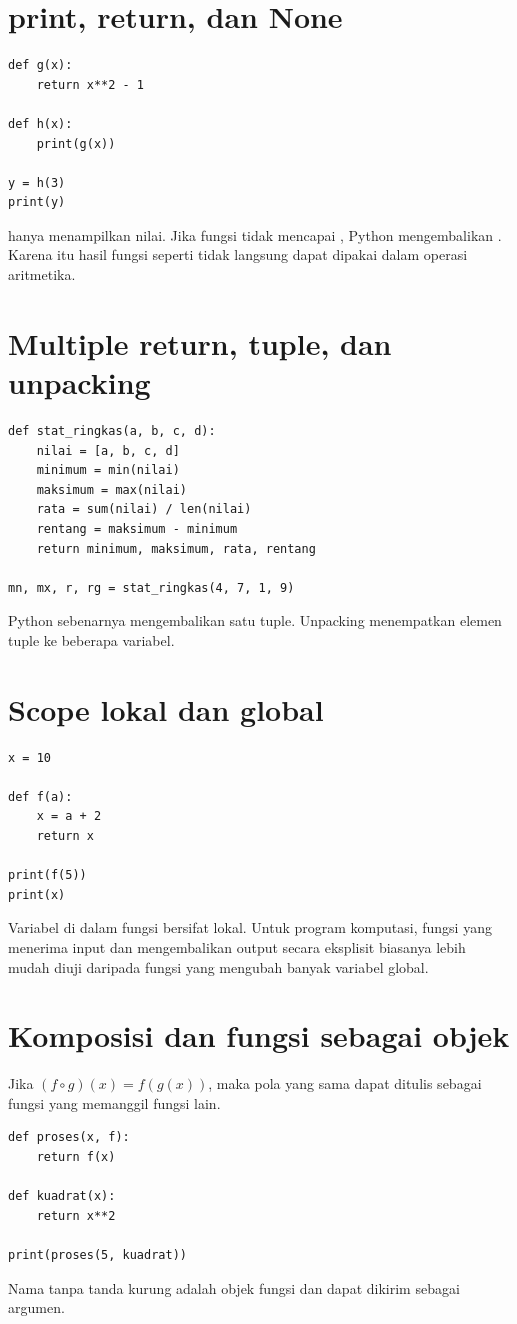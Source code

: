 \documentclass[11pt,a4paper]{report}
\newcommand{\kode}[1]{\texttt{\detokenize{#1}}}
\begin{document}
\section{print, return, dan None}
\begin{lstlisting}
def g(x):
    return x**2 - 1

def h(x):
    print(g(x))

y = h(3)
print(y)
\end{lstlisting}
\kode{print} hanya menampilkan nilai. Jika fungsi tidak mencapai \kode{return}, Python mengembalikan \kode{None}. Karena itu hasil fungsi seperti \kode{h} tidak langsung dapat dipakai dalam operasi aritmetika.

\section{Multiple return, tuple, dan unpacking}
\begin{lstlisting}
def stat_ringkas(a, b, c, d):
    nilai = [a, b, c, d]
    minimum = min(nilai)
    maksimum = max(nilai)
    rata = sum(nilai) / len(nilai)
    rentang = maksimum - minimum
    return minimum, maksimum, rata, rentang

mn, mx, r, rg = stat_ringkas(4, 7, 1, 9)
\end{lstlisting}
Python sebenarnya mengembalikan satu tuple. Unpacking menempatkan elemen tuple ke beberapa variabel.

\section{Scope lokal dan global}
\begin{lstlisting}
x = 10

def f(a):
    x = a + 2
    return x

print(f(5))
print(x)
\end{lstlisting}
Variabel \kode{x} di dalam fungsi bersifat lokal. Untuk program komputasi, fungsi yang menerima input dan mengembalikan output secara eksplisit biasanya lebih mudah diuji daripada fungsi yang mengubah banyak variabel global.

\section{Komposisi dan fungsi sebagai objek}
Jika $(f\circ g)(x)=f(g(x))$, maka pola yang sama dapat ditulis sebagai fungsi yang memanggil fungsi lain.
\begin{lstlisting}
def proses(x, f):
    return f(x)

def kuadrat(x):
    return x**2

print(proses(5, kuadrat))
\end{lstlisting}
Nama \kode{kuadrat} tanpa tanda kurung adalah objek fungsi dan dapat dikirim sebagai argumen.
\end{document}
